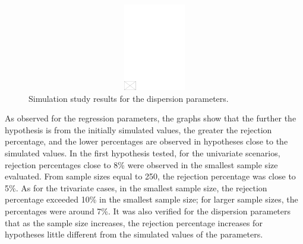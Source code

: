 \documentclass[AMA,STIX1COL]{WileyNJD-v2}
\begin{document}
\begin{figure}[h]
\centerline{\includegraphics[width=342pt,height=9pc,draft]{empty}}
\caption{Simulation study results for the dispersion parameters.\label{fig3}}
\end{figure}

As observed for the regression parameters, the graphs show that the further the hypothesis is from the initially simulated values, the greater the rejection percentage, and the lower percentages are observed in hypotheses close to the simulated values. In the first hypothesis tested, for the univariate scenarios, rejection percentages close to 8\% were observed in the smallest sample size evaluated. From sample sizes equal to 250, the rejection percentage was close to 5\%. As for the trivariate cases, in the smallest sample size, the rejection percentage exceeded 10\% in the smallest sample size; for larger sample sizes, the percentages were around 7\%. It was also verified for the dispersion parameters that as the sample size increases, the rejection percentage increases for hypotheses little different from the simulated values of the parameters.
\end{document}
